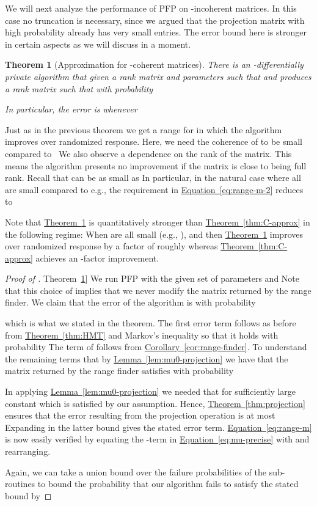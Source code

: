 \documentclass[letterpaper,11pt]{article}
\newtheorem{theorem}{Theorem}[section]
\theoremstyle{definition}
\newcommand{\corollaryref}[1]{\hyperref[cor:#1]{Corollary~\ref{cor:#1}}}
\newcommand{\equationref}[1]{\hyperref[eq:#1]{Equation~\ref{eq:#1}}}
\newcommand{\lemmaref}[1]{\hyperref[lem:#1]{Lemma~\ref{lem:#1}}}
\newcommand{\theoremlabel}[1]{\label{thm:#1}}
\newcommand{\theoremref}[1]{\hyperref[thm:#1]{Theorem~\ref{thm:#1}}}
\newcommand{\PFP}{\textrm{\small PFP}\xspace}
\begin{document}
We will next analyze the performance of \PFP on -incoherent matrices. In this
case no truncation is necessary, since we argued that the projection matrix
with high probability already has very small entries. The error bound here is
stronger in certain aspects as we will discuss in a moment.

\begin{theorem}[Approximation for -coherent matrices]
\theoremlabel{mu-approx}
There is an -differentially private algorithm that
given a rank  matrix  and parameters
 such that  and 
produces a rank  matrix  such that with probability 

In particular, the error is  whenever

\end{theorem}

Just as in the previous theorem we get a range for  in which the algorithm
improves over randomized response. Here, we need the coherence of  to be
small compared to~ We also observe a dependence on the rank of the matrix.
This means the algorithm presents no improvement if the matrix is close to
being full rank.  Recall that  can be as small as  In
particular, in the natural case where  all are small compared
to  e.g.,  the requirement in \equationref{range-m-2} reduces to


Note that \theoremref{mu-approx} is quantitatively stronger than
\theoremref{C-approx} in the following regime: When  are all
small (e.g., ),  and 
then \theoremref{mu-approx}
improves over randomized response by a factor of roughly  whereas
\theoremref{C-approx} achieves an -factor improvement.

\begin{proof}[Proof of \theoremref{mu-approx}]
We run \PFP with the given set of parameters 
and  Note that this choice of  implies that we never modify
the matrix returned by the range finder.
We claim that the error of the algorithm is with probability 

which is what we stated in the theorem. The first error term follows as before
from \theoremref{HMT} and Markov's inequality so that it holds with
probability 
The term of 
follows from \corollaryref{range-finder}. To understand
the remaining terms that by \lemmaref{mu0-projection} we have that the matrix
 returned by the range finder satisfies with
probability 

In applying \lemmaref{mu0-projection} we needed that  for
sufficiently large constant which is satisfied by our assumption.
Hence, \theoremref{projection}
ensures that the error resulting from the projection
operation is at most  Expanding
 in the latter bound gives the stated error term.
\equationref{range-m} is now easily verified by
equating the -term in \equationref{mu-precise} with
 and rearranging.

Again, we can take a union bound over the failure probabilities of the
sub-routines to bound the probability that our algorithm fails to satisfy the
stated bound by 
\end{proof}
\end{document}
